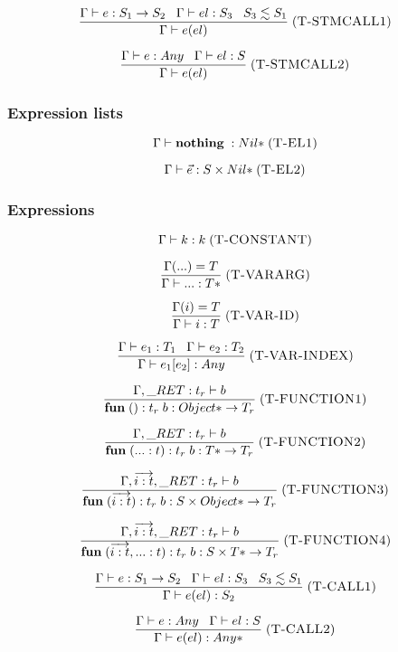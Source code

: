 \documentclass[12pt]{article}
\newcommand{\mylabel}[1]{\; (\textsc{#1})}
\newcommand{\kw}[1]{\mathbf{#1} \;}
\newcommand{\env}{\Gamma}
\newcommand{\ret}{\string_RET}
\begin{document}
\[
\frac{\env \vdash e:S_{1} \rightarrow S_{2} \;\;\;
      \env \vdash el:S_{3} \;\;\;
      S_{3} \lesssim S_{1}}
     {\env \vdash e(el)}
\mylabel{T-STMCALL1}
\]

\[
\frac{\env \vdash e:Any \;\;\;
      \env \vdash el:S}
     {\env \vdash e(el)}
\mylabel{T-STMCALL2}
\]

\subsubsection{Expression lists}

\[
\env \vdash \kw{nothing}:{Nil*}
\mylabel{T-EL1}
\]

\[
\env \vdash \vec{e}:S \times {Nil*}
\mylabel{T-EL2}
\]

\subsubsection{Expressions}

\[
\env \vdash k : k
\mylabel{T-CONSTANT}
\]

\[
\frac{\env({...}) = T}
     {\env \vdash {...} : {T*}}
\mylabel{T-VARARG}
\]

\[
\frac{\env(i) = T}
     {\env \vdash i : T}
\mylabel{T-VAR-ID}
\]

\[
\frac{\env \vdash e_{1}:T_{1} \;\;\;
      \env \vdash e_{2}:T_{2}}
     {\env \vdash e_{1}[e_{2}] : Any}
\mylabel{T-VAR-INDEX}
\]

\[
\frac{\env, \ret:t_{r} \vdash b}
     {\kw{fun} ():t_{r} \; b : {Object*} \rightarrow T_{r}}
\mylabel{T-FUNCTION1}
\]

\[
\frac{\env, \ret:t_{r} \vdash b}
     {\kw{fun} ({...}:t):t_{r} \; b : {T*} \rightarrow T_{r}}
\mylabel{T-FUNCTION2}
\]

\[
\frac{\env, \overrightarrow{i:t}, \ret:t_{r} \vdash b}
     {\kw{fun} (\overrightarrow{i:t}):t_{r} \; b :
      S \times {Object*} \rightarrow T_{r}}
\mylabel{T-FUNCTION3}
\]

\[
\frac{\env, \overrightarrow{i:t}, \ret:t_{r} \vdash b}
     {\kw{fun} (\overrightarrow{i:t}, {...}:t):t_{r} \; b :
      S \times {T*} \rightarrow T_{r}}
\mylabel{T-FUNCTION4}
\]

\[
\frac{\env \vdash e:S_{1} \rightarrow S_{2} \;\;\;
      \env \vdash el:S_{3} \;\;\;
      S_{3} \lesssim S_{1}}
     {\env \vdash e(el) : S_{2}}
\mylabel{T-CALL1}
\]

\[
\frac{\env \vdash e:Any \;\;\;
      \env \vdash el:S}
     {\env \vdash e(el) : {Any*}}
\mylabel{T-CALL2}
\]
\end{document}
